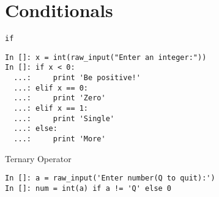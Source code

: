 \documentclass[12pt]{article}
\newcommand{\typ}[1]{\lstinline{#1}}
\begin{document}
\section{Conditionals}
\typ{if}
\begin{lstlisting}
In []: x = int(raw_input("Enter an integer:"))
In []: if x < 0:
  ...:     print 'Be positive!'
  ...: elif x == 0:
  ...:     print 'Zero'
  ...: elif x == 1:
  ...:     print 'Single'
  ...: else:
  ...:     print 'More'
\end{lstlisting}
Ternary Operator
\begin{lstlisting}
In []: a = raw_input('Enter number(Q to quit):')
In []: num = int(a) if a != 'Q' else 0
\end{lstlisting}
\end{document}
